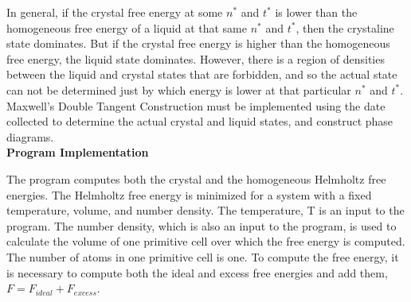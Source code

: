 \documentclass[12pt]{article}
\begin{document}
In general, if the crystal free energy at some $n^*$ and $t^*$ is lower than the homogeneous free energy of a liquid at that same $n^*$ and $t^*$, then the crystaline state dominates. But if the crystal free energy is higher than the homogeneous free energy, the liquid state dominates. However, there is a region of densities between the liquid and crystal states that are forbidden, and so the actual state can not be determined just by which energy is lower at that particular $n^*$ and $t^*$. Maxwell's Double Tangent Construction must be implemented using the date collected to determine the actual crystal and liquid states, and construct phase diagrams. 
\[{}\]
\textbf{Program Implementation}

The program computes both the crystal and the homogeneous Helmholtz free energies. The Helmholtz free energy is minimized for a system with a fixed temperature, volume, and number density. The temperature, T is an input to the program. The number density, which is also an input to the program, is used to calculate the volume of one primitive cell over which the free energy is computed. The number of atoms in one primitive cell is one. To compute the free energy, it is necessary to compute both the ideal and excess free energies and add them, $F = F_{ideal} + F_{excess}$.
\end{document}

